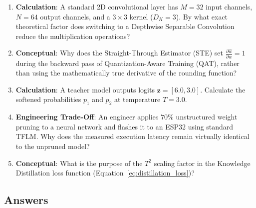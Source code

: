 \begin{checkyourself}
\begin{enumerate}
    \item \textbf{Calculation}: A standard 2D convolutional layer has $M = 32$ input channels, $N = 64$ output channels, and a $3 \times 3$ kernel ($D_K = 3$). By what exact theoretical factor does switching to a Depthwise Separable Convolution reduce the multiplication operations?
    \item \textbf{Conceptual}: Why does the Straight-Through Estimator (STE) set $\frac{\partial \hat{w}}{\partial w} = 1$ during the backward pass of Quantization-Aware Training (QAT), rather than using the mathematically true derivative of the rounding function?
    \item \textbf{Calculation}: A teacher model outputs logits $\mathbf{z} = [6.0, 3.0]$. Calculate the softened probabilities $p_1$ and $p_2$ at temperature $T = 3.0$.
    \item \textbf{Engineering Trade-Off}: An engineer applies $70\%$ unstructured weight pruning to a neural network and flashes it to an ESP32 using standard TFLM. Why does the measured execution latency remain virtually identical to the unpruned model?
    \item \textbf{Conceptual}: What is the purpose of the $T^2$ scaling factor in the Knowledge Distillation loss function (Equation~\eqref{eq:distillation_loss})?
\end{enumerate}
\end{checkyourself}

\subsection*{Answers}

